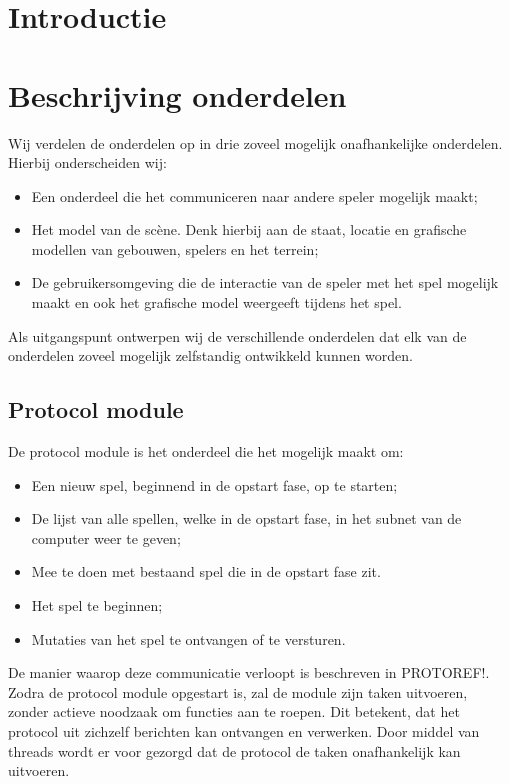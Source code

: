 \documentclass[a4paper,11pt]{article}
\newcommand{\protoref}{PROTOREF!}
\begin{document}
	
	
	\tableofcontents
	\newpage

	\section{Introductie}
	
	\newpage
    
    
    \section{Beschrijving onderdelen}
    Wij verdelen de onderdelen op in drie zoveel mogelijk onafhankelijke onderdelen. Hierbij onderscheiden wij:
    \begin{itemize}
    	\item Een onderdeel die het communiceren naar andere speler mogelijk maakt;
	\item Het model van de sc\`ene. Denk hierbij aan de staat, locatie en grafische modellen van gebouwen, spelers en het terrein;
	\item De gebruikersomgeving die de interactie van de speler met het spel mogelijk maakt en ook het grafische model weergeeft tijdens het spel.
    \end{itemize}
    
    Als uitgangspunt ontwerpen wij de verschillende onderdelen dat elk van de onderdelen zoveel mogelijk zelfstandig ontwikkeld kunnen worden.
    	
    \subsection{Protocol module}
    	De protocol module is het onderdeel die het mogelijk maakt om:
	\begin{itemize}
		\item Een nieuw spel, beginnend in de opstart fase, op te starten;
		\item De lijst van alle spellen, welke in de opstart fase, in het subnet van de computer weer te geven;
		\item Mee te doen met bestaand spel die in de opstart fase zit.
		\item Het spel te beginnen;
		\item Mutaties van het spel te ontvangen of te versturen.
	\end{itemize}
	De manier waarop deze communicatie verloopt is beschreven in \protoref. Zodra de protocol module opgestart is, zal de module zijn taken uitvoeren, zonder actieve noodzaak om functies aan te roepen. Dit betekent, dat het protocol uit zichzelf berichten kan ontvangen en verwerken. Door middel van threads wordt er voor gezorgd dat de protocol de taken onafhankelijk kan uitvoeren.
	
\end{document}

